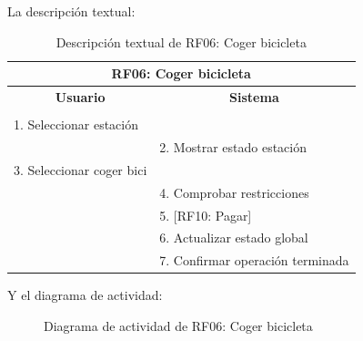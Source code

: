 \begin{itemize}
	La descripción textual:
	
	\begin{table}[h]
		\centering	
		\begin{tabular}{|l|l|}
			\hline
			\multicolumn{2}{|c|}{\textbf{RF06: Coger bicicleta}} \\ \hline
			\multicolumn{1}{|c|}{\textbf{Usuario}} & \multicolumn{1}{c|}{\textbf{Sistema}} \\ \hline
			[Pto. inclusión: RF02: Loguear usuario] &\\ \hline
			1. Seleccionar estación &\\ \hline
			& 2. Mostrar estado estación \\ \hline
			3. Seleccionar coger bici &\\ \hline
			& 4. Comprobar restricciones \\ \hline
			& 5. [RF10: Pagar] \\ \hline
			& 6. Actualizar estado global \\ \hline
			& 7. Confirmar operación terminada \\ \hline 	
		\end{tabular}
		\caption{Descripción textual de RF06: Coger bicicleta}
		\label{tab:tablaDescTextualRF06}
	\end{table}
	
	\FloatBarrier
	Y el diagrama de actividad:
	
	\begin{figure}[!htb]
		\centering
		\caption{Diagrama de actividad de RF06: Coger bicicleta}
		\label{fig:diagramaActividad_RF06}
	\end{figure}
	

\end{itemize}

